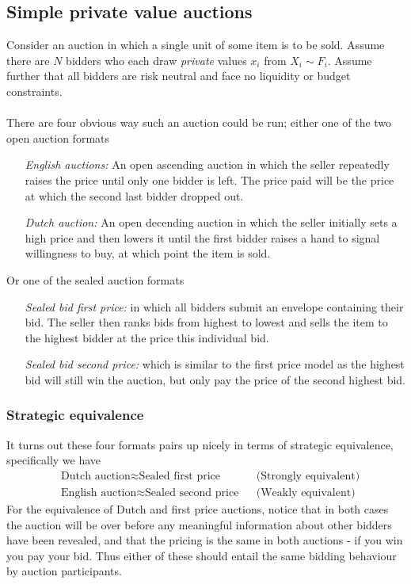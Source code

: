 \subsection{Simple private value auctions}
Consider an auction in which a single unit of some item is to be sold. Assume there are $N$ bidders who each draw \textit{private} values $x_i$ from $X_i \sim F_i$. Assume further that all bidders are risk neutral and face no liquidity or budget constraints.
\\ \\
There are four obvious way such an auction could be run; either one of the two open auction formats

\begin{enumerate}[align=left]
  \item[\textit{English auctions:}] An open ascending auction in which the seller repeatedly raises the price until only one bidder is left. The price paid will be the price at which the second last bidder dropped out.
  \item[\textit{Dutch auction:}] An open decending auction in which the seller initially sets a high price and then lowers it until the first bidder raises a hand to signal willingness to buy, at which point the item is sold.
\end{enumerate}
Or one of the sealed auction formats

\begin{enumerate}[align=left]
  \item[\textit{Sealed bid first price:}] in which all bidders submit an envelope containing their bid. The seller then ranks bids from highest to lowest and sells the item to the highest bidder at the price this individual bid.
  \item[\textit{Sealed bid second price:}] which is similar to the first price model as the highest bid will still win the auction, but only pay the price of the second highest bid.
\end{enumerate}

\subsubsection{Strategic equivalence}
It turns out these four formats pairs up nicely in terms of strategic equivalence, specifically we have
\begin{align*}
  &\textrm{Dutch auction} \approx \textrm{Sealed first price} && \textrm{(Strongly equivalent)}  \\
  &\textrm{English auction} \approx \textrm{Sealed second price} && \textrm{(Weakly equivalent)}
\end{align*}
For the equivalence of Dutch and first price auctions, notice that in both cases the auction will be over before any meaningful information about other bidders have been revealed, and that the pricing is the same in both auctions - if you win you pay your bid. Thus either of these should entail the same bidding behaviour by auction participants.


